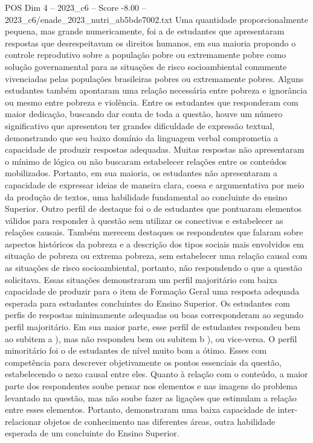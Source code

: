 \begin{textsample}{POS Dim 4 – 2023\_c6 – Score -8.00 – 2023\_c6/enade\_2023\_nutri\_ab5bde7002.txt}
Uma quantidade proporcionalmente pequena, mas grande numericamente, foi a de estudantes que apresentaram respostas que desrespeitavam os direitos humanos, em sua maioria propondo o controle reprodutivo sobre a população pobre ou extremamente pobre como solução governamental para as situações de risco socioambiental comumente vivenciadas pelas populações brasileiras pobres ou extremamente pobres.
Alguns estudantes também apontaram uma relação necessária entre pobreza e ignorância ou mesmo entre pobreza e violência.
Entre os estudantes que responderam com maior dedicação, buscando dar conta de toda a questão, houve um número significativo que apresentou ter grandes dificuldade de expressão textual, demonstrando que seu baixo domínio da linguagem verbal comprometia a capacidade de produzir respostas adequadas.
Muitas respostas não apresentaram o mínimo de lógica ou não buscaram estabelecer relações entre os conteúdos mobilizados.
Portanto, em sua maioria, os estudantes não apresentaram a capacidade de expressar ideias de maneira clara, coesa e argumentativa por meio da produção de textos, uma habilidade fundamental ao concluinte do ensino Superior.
Outro perfil de destaque foi o de estudantes que pontuaram elementos válidos para responder à questão sem utilizar os conectivos e estabelecer as relações causais.
Também merecem destaques os respondentes que falaram sobre aspectos históricos da pobreza e a descrição dos tipos sociais mais envolvidos em situação de pobreza ou extrema pobreza, sem estabelecer uma relação causal com as situações de risco socioambiental, portanto, não respondendo o que a questão solicitava.
Essas situações demonstraram um perfil majoritário com baixa capacidade de produzir para o item de Formação Geral uma resposta adequada esperada para estudantes concluintes do Ensino Superior.
Os estudantes com perfis de respostas minimamente adequadas ou boas corresponderam ao segundo perfil majoritário.
Em sua maior parte, esse perfil de estudantes respondeu bem ao subitem a ), mas não respondeu bem ou subitem b ), ou vice-versa.
O perfil minoritário foi o de estudantes de nível muito bom a ótimo.
Esses com competência para descrever objetivamente os pontos essenciais da questão, estabelecendo o nexo causal entre eles.
Quanto à relação com o conteúdo, a maior parte dos respondentes soube pensar nos elementos e nas imagens do problema levantado na questão, mas não soube fazer as ligações que estimulam a relação entre esses elementos.
Portanto, demonstraram uma baixa capacidade de inter-relacionar objetos de conhecimento nas diferentes áreas, outra habilidade esperada de um concluinte do Ensino Superior.

\end{textsample}

